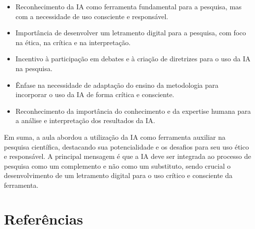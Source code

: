 \documentclass[
  a4paper,
]{article}
\providecommand{\tightlist}{%
  \setlength{\itemsep}{0pt}\setlength{\parskip}{0pt}}\usepackage{longtable,booktabs,array}
\begin{document}
\begin{tcolorbox}
\begin{itemize}
\tightlist
\item
  Reconhecimento da IA como ferramenta fundamental para a pesquisa, mas
  com a necessidade de uso consciente e responsável.
\item
  Importância de desenvolver um letramento digital para a pesquisa, com
  foco na ética, na crítica e na interpretação.
\item
  Incentivo à participação em debates e à criação de diretrizes para o
  uso da IA na pesquisa.
\item
  Ênfase na necessidade de adaptação do ensino da metodologia para
  incorporar o uso da IA de forma crítica e consciente.
\item
  Reconhecimento da importância do conhecimento e da expertise humana
  para a análise e interpretação dos resultados da IA.
\end{itemize}

Em suma, a aula abordou a utilização da IA como ferramenta auxiliar na
pesquisa científica, destacando sua potencialidade e os desafios para
seu uso ético e responsável. A principal mensagem é que a IA deve ser
integrada ao processo de pesquisa como um complemento e não como um
substituto, sendo crucial o desenvolvimento de um letramento digital
para o uso crítico e consciente da ferramenta.

\end{tcolorbox}


\section*{Referências}\label{referuxeancias}

\end{document}
